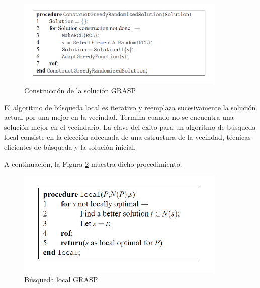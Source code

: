 \documentclass[a4paper,12pt]{book}
\begin{document}
		\begin{figure}[h]
			\centering
			\includegraphics[width=10cm]{./Graphics/GRASPconstructionphase.png}
			\caption{Construcción de la solución GRASP}
			\label{GRASPconstructionphase}
		\end{figure}
	
		El algoritmo de búsqueda local es iterativo y reemplaza sucesivamente la solución actual por una mejor en la vecindad. Termina cuando no se encuentra una solución mejor en el vecindario. La clave del éxito para un algoritmo de búsqueda local consiste en la elección adecuada de una estructura de la vecindad, técnicas eficientes de búsqueda y la solución inicial.
		
		A continuación, la Figura \ref{GRASPlocal} muestra dicho procedimiento.
		
		\begin{figure}[h]
			\centering
			\includegraphics[width=10cm]{./Graphics/GRASPlocal.png}
			\caption{Búsqueda local GRASP}
			\label{GRASPlocal}
		\end{figure}
	
\end{document}
